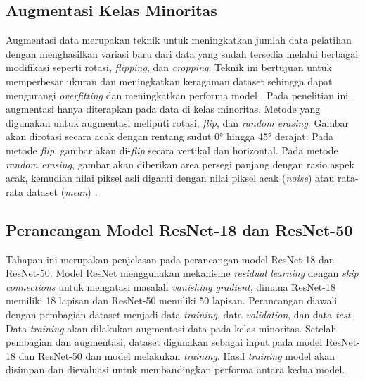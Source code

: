 \subsection{Augmentasi Kelas Minoritas} \label{III.Langkah 5}
Augmentasi data merupakan teknik untuk meningkatkan jumlah data pelatihan 
dengan menghasilkan variasi baru dari data yang sudah tersedia melalui 
berbagai modifikasi seperti rotasi, \textit{flipping}, dan \textit{cropping}. 
Teknik ini bertujuan untuk memperbesar ukuran dan meningkatkan keragaman 
dataset sehingga dapat mengurangi \textit{overfitting} dan meningkatkan 
performa model \cite{MAHARANA202291}. Pada penelitian ini, augmentasi hanya 
diterapkan pada data di kelas minoritas. Metode yang digunakan untuk 
augmentasi meliputi rotasi, \textit{flip}, dan \textit{random erasing}. 
Gambar akan dirotasi secara acak dengan rentang sudut 0° hingga 45° derajat. 
Pada metode \textit{flip}, gambar akan di-\textit{flip} secara vertikal dan 
horizontal. Pada metode \textit{random erasing}, gambar akan diberikan area 
persegi panjang dengan rasio aspek acak, kemudian nilai piksel asli diganti 
dengan nilai piksel acak (\textit{noise}) atau rata-rata dataset 
(\textit{mean}) \cite{tumewu2020klasifikasi}. \par

\subsection{Perancangan Model ResNet-18 dan ResNet-50} \label{III.Langkah 6}
Tahapan ini merupakan penjelasan pada perancangan model ResNet-18 dan ResNet-50. 
Model ResNet menggunakan mekanisme \textit{residual learning} dengan 
\textit{skip connections} untuk mengatasi masalah \textit{vanishing gradient}, 
dimana ResNet-18 memiliki 18 lapisan dan ResNet-50 memiliki 50 lapisan. 
Perancangan diawali dengan pembagian dataset menjadi data \textit{training}, 
data \textit{validation}, dan data \textit{test}. Data \textit{training} 
akan dilakukan augmentasi data pada kelas minoritas. Setelah pembagian dan 
augmentasi, dataset digunakan sebagai input pada model ResNet-18 dan ResNet-50 
dan model melakukan \textit{training}. Hasil \textit{training} model akan 
disimpan dan dievaluasi untuk membandingkan performa antara kedua model. \par

